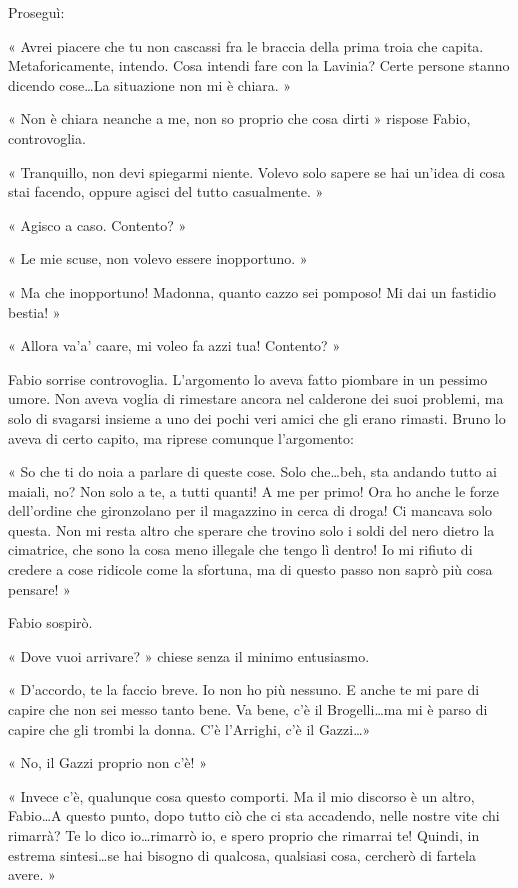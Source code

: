 Proseguì:

« Avrei piacere che tu non cascassi fra le braccia della prima troia che capita. Metaforicamente, intendo. Cosa intendi fare con la Lavinia? Certe persone stanno dicendo cose\ldots La situazione non mi è chiara. »

« Non è chiara neanche a me, non so proprio che cosa dirti » rispose Fabio, controvoglia.

« Tranquillo, non devi spiegarmi niente. Volevo solo sapere se hai un'idea di cosa stai facendo, oppure agisci del tutto casualmente. »

« Agisco a caso. Contento? »

« Le mie scuse, non volevo essere inopportuno. »

« Ma che inopportuno! Madonna, quanto cazzo sei pomposo! Mi dai un fastidio bestia! »

« Allora va'a' caare, mi voleo fa \textsc{}azzi tua! Contento? »

Fabio sorrise controvoglia. L'argomento lo aveva fatto piombare in un pessimo umore. Non aveva voglia di rimestare ancora nel calderone dei suoi problemi, ma solo di svagarsi insieme a uno dei pochi veri amici che gli erano rimasti. Bruno lo aveva di certo capito, ma riprese comunque l'argomento:

« So che ti do noia a parlare di queste cose. Solo che\ldots beh, sta andando tutto ai maiali, no? Non solo a te, a tutti quanti! A me per primo! Ora ho anche le forze dell'ordine che gironzolano per il magazzino in cerca di droga! Ci mancava solo questa. Non mi resta altro che sperare che trovino solo i soldi del nero dietro la cimatrice, che sono la cosa meno illegale che tengo lì dentro! Io mi rifiuto di credere a cose ridicole come la sfortuna, ma di questo passo non saprò più cosa pensare! »

Fabio sospirò.

« Dove vuoi arrivare? » chiese senza il minimo entusiasmo.

« D'accordo, te la faccio breve. Io non ho più nessuno. E anche te mi pare di capire che non sei messo tanto bene. Va bene, c'è il Brogelli\ldots ma mi è parso di capire che gli trombi la donna. C'è l'Arrighi, c'è il Gazzi\ldots »

 « No, il Gazzi proprio non c'è!  »

« Invece c'è, qualunque cosa questo comporti. Ma il mio discorso è un altro, Fabio\ldots A questo punto, dopo tutto ciò che ci sta accadendo, nelle nostre vite chi rimarrà? Te lo dico io\ldots rimarrò io, e spero proprio che rimarrai te! Quindi, in estrema sintesi\ldots se hai bisogno di qualcosa, qualsiasi cosa, cercherò di fartela avere. »

